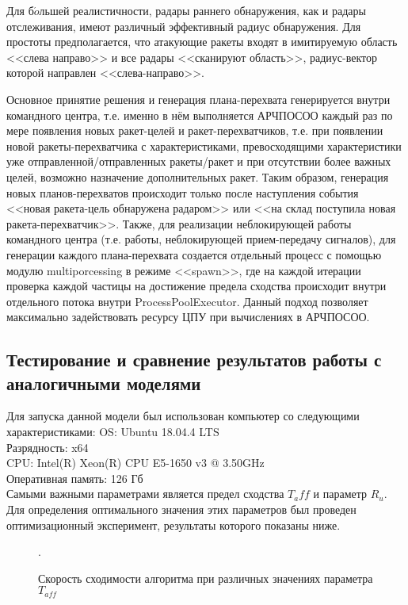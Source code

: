 Для б$\acute{o}$льшей реалистичности, радары раннего обнаружения, как и радары отслеживания, имеют различный эффективный радиус обнаружения. Для простоты предполагается, что атакующие ракеты входят в имитируемую область <<слева направо>> и все радары <<сканируют область>>, радиус-вектор которой направлен <<слева-направо>>.

Основное принятие решения и генерация плана-перехвата генерируется внутри командного центра, т.е. именно в нём выполняется АРЧПОСОО каждый раз по мере появления новых ракет-целей и ракет-перехватчиков, т.е. при появлении новой ракеты-перехватчика с характеристиками, превосходящими характеристики уже отправленной/отправленных ракеты/ракет и при отсутствии более важных целей, возможно назначение дополнительных ракет. Таким образом, генерация новых планов-перехватов происходит только после наступления события <<новая ракета-цель обнаружена радаром>> или <<на склад поступила новая ракета-перехватчик>>. Также, для реализации неблокирующей работы командного центра (т.е. работы, неблокирующей прием-передачу сигналов), для генерации каждого плана-перехвата создается отдельный процесс с помощью модулю multiporcessing в режиме <<spawn>>, где на каждой итерации проверка каждой частицы на достижение предела сходства происходит внутри отдельного потока внутри ProcessPoolExecutor. Данный подход позволяет максимально задействовать ресурсу ЦПУ при вычислениях  в АРЧПОСОО. 


\subsection{Тестирование и сравнение результатов работы с аналогичными моделями }

Для запуска данной модели был использован компьютер со следующими характеристиками:
OS: Ubuntu 18.04.4 LTS \\
Разрядность: x64 \\
CPU:  Intel(R) Xeon(R) CPU E5-1650 v3 @ 3.50GHz \\
Оперативная память: 126 Гб \\

Самыми важными параметрами является предел сходства $T_aff$ и параметр $R_u$. Для определения оптимального значения этих параметров был проведен оптимизационный эксперимент, результаты которого показаны ниже.


\begin{figure*}[h!]
	\caption{Скорость сходимости алгоритма при различных значениях параметра $T_{aff}$}.
\end{figure*} 

